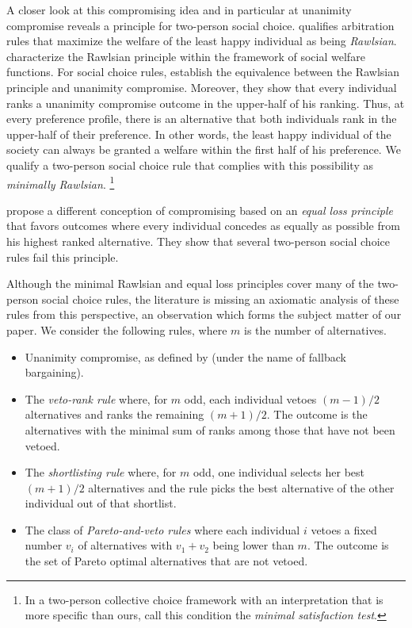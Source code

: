 \documentclass[pagesize, twoside=off, bibliography=totoc, DIV=calc, fontsize=12pt, a4paper]{scrartcl}
\begin{document}
A closer look at this compromising idea and in particular at unanimity compromise reveals a principle for two-person social choice.  qualifies arbitration rules that maximize the welfare of the least happy individual as being \textit{Rawlsian}. \citet{congar2012characterization} characterize the Rawlsian principle within the framework of social welfare functions. For social choice rules, \citet{BramsKilgour2001} establish the equivalence between the Rawlsian principle and unanimity compromise. Moreover, they show that every individual ranks a unanimity compromise outcome in the upper-half of his ranking. Thus, at every preference profile, there is an alternative that both individuals rank in the upper-half of their preference. In other words, the least happy individual of the society can always be granted a welfare within the first half of his preference. We qualify a two-person social choice rule that complies with this possibility as \textit{minimally Rawlsian}.%
\footnote{In a two-person collective choice framework with an interpretation that is more specific than ours, \citet{Clippel} call this condition the \textit{minimal satisfaction test}.}

 propose a different conception of compromising based on an \textit{equal loss principle} that favors outcomes where every individual concedes as equally as possible from his highest ranked alternative. They show that several two-person social choice rules fail this principle.

Although the minimal Rawlsian and equal loss principles cover many of the two-person social choice rules, the literature is missing an axiomatic analysis of these rules from this perspective, an observation which forms the subject matter of our paper. We consider the following rules, where $m$ is the number of alternatives.
\begin{itemize}
	\item Unanimity compromise, as defined by \citet{BramsKilgour2001} (under the name of fallback bargaining).
	\item The \textit{veto-rank rule} where, for $m$ odd, each individual vetoes $(m - 1) / 2$ alternatives and ranks the remaining $(m+1) / 2$. The outcome is the alternatives with the minimal sum of ranks among those that have not been vetoed.
	\item The \textit{shortlisting rule} where, for $m$ odd, one individual selects her best $(m+1) / 2$ alternatives and the rule picks the best alternative of the other individual out of that shortlist.
	\item The class of \textit{Pareto-and-veto rules} where each individual $i$ vetoes a fixed number $v_i$ of alternatives with $v_1 + v_2$ being lower than $m$. The outcome is the set of Pareto optimal alternatives that are not vetoed. 
\end{itemize}
\end{document}
